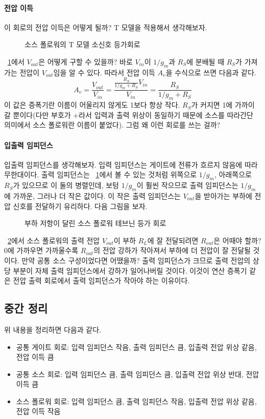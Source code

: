 \paragraph{전압 이득}
이 회로의 전압 이득은 어떻게 될까? T 모델을 적용해서 생각해보자.
\begin{figure}[!hbp]
    \centering
    \caption{소스 폴로워의 T 모델 소신호 등가회로}\label{fig:src follower eq circuit}
\end{figure}
\figurename~\ref{fig:src follower eq circuit}에서 $V_{out}$은 어떻게 구할 수 있을까? 바로 $V_{in}$이 $1/g_m$과 $R_S$에 분배될 때 $R_S$가 가져가는 전압이 $V_{out}$임을 알 수 있다.
따라서 전압 이득 $A_v$을 수식으로 쓰면 다음과 같다.
\begin{equation}
    A_v=\frac{V_{out}}{V_{in}}=\frac{\frac{R_S}{1/g_m+R_S}V_{in}}{V_{in}}=\frac{R_S}{1/g_m+R_S}
\end{equation}
이 값은 증폭기란 이름이 어울리지 않게도 1보다 항상 작다. $R_S$가 커지면 1에 가까이 갈 뿐이다(다만 부호가 +라서 입력과 출력 위상이 동일하기 때문에 소스를 따라간단 의미에서 소스 폴로워란 이름이 붙었다).
그럼 왜 이런 회로를 쓰는 걸까?
\paragraph{입출력 임피던스}
입출력 임피던스를 생각해보자. 입력 임피던스는 게이트에 전류가 흐르지 않음에 따라 무한대이다. 출력 임피던스는 \figurename~\ref{fig:src follower eq circuit}에서 볼 수 있는 것처럼 위쪽으로 $1/g_m$, 아래쪽으로 $R_S$가 있으므로 이 둘의 병렬인데, 보텅 $1/g_m$이 훨씬 작으므로 출력 임피던스는 $1/g_m$에 가까운, 그러나 더 작은 값이다.
이 작은 출력 임피던스는 $V_{out}$을 받아가는 부하에 전압 신호를 전달하기 유리하다. 다음 그림을 보자.
\begin{figure}[!hbp]
    \centering
    \caption{부하 저항이 달린 소스 폴로워 테브닌 등가 회로}\label{fig:src follower Thevnin eq circuit}
\end{figure}
\figurename~\ref{fig:src follower Thevnin eq circuit}에서 소스 폴로워의 출력 전압 $V_{out}$이 부하 $R_L$에 잘 전달되려면 $R_{out}$은 어때야 할까? 0에 가까우면 가까울수록 $R_{out}$의 전압 강하가 작아져서 부하에 더 전압이 잘 전달될 것이다.
만약 공통 소스 구성이었다면 어땠을까? 출력 임피던스가 크므로 출력 전압의 상당 부분이 자체 출력 임피던스에서 강하가 일어나버릴 것이다.
이것이 연산 증폭기 같은 전압 출력 회로에서 출력 임피던스가 작아야 하는 이유이다.

\subsection{중간 정리}
위 내용을 정리하면 다음과 같다.
\begin{itemize}
    \item 공통 게이트 회로: 입력 임피던스 작음, 출력 임피던스 큼, 입출력 전압 위상 같음, 전압 이득 큼
    \item 공통 소스 회로: 입력 임피던스 큼, 출력 임피던스 큼, 입출력 전압 위상 반대, 전압 이득 큼
    \item 소스 폴로워 회로: 입력 임피던스 큼, 출력 임피던스 작음, 입출력 전압 위상 같음, 전압 이득 작음
\end{itemize}
